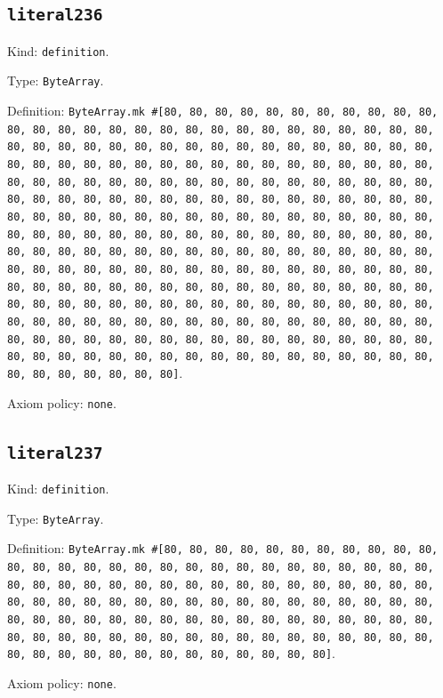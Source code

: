 \documentclass[11pt]{article}
\begin{document}
\subsection*{\texttt{literal236}}
\noindent Kind: \texttt{definition}.\par
\noindent Type: \texttt{ByteArray}.\par
\noindent Definition: \texttt{ByteArray.mk \#[80, 80, 80, 80, 80, 80, 80, 80, 80, 80, 80, 80, 80, 80, 80, 80, 80, 80, 80, 80, 80, 80, 80, 80, 80, 80, 80, 80, 80, 80, 80, 80, 80, 80, 80, 80, 80, 80, 80, 80, 80, 80, 80, 80, 80, 80, 80, 80, 80, 80, 80, 80, 80, 80, 80, 80, 80, 80, 80, 80, 80, 80, 80, 80, 80, 80, 80, 80, 80, 80, 80, 80, 80, 80, 80, 80, 80, 80, 80, 80, 80, 80, 80, 80, 80, 80, 80, 80, 80, 80, 80, 80, 80, 80, 80, 80, 80, 80, 80, 80, 80, 80, 80, 80, 80, 80, 80, 80, 80, 80, 80, 80, 80, 80, 80, 80, 80, 80, 80, 80, 80, 80, 80, 80, 80, 80, 80, 80, 80, 80, 80, 80, 80, 80, 80, 80, 80, 80, 80, 80, 80, 80, 80, 80, 80, 80, 80, 80, 80, 80, 80, 80, 80, 80, 80, 80, 80, 80, 80, 80, 80, 80, 80, 80, 80, 80, 80, 80, 80, 80, 80, 80, 80, 80, 80, 80, 80, 80, 80, 80, 80, 80, 80, 80, 80, 80, 80, 80, 80, 80, 80, 80, 80, 80, 80, 80, 80, 80, 80, 80, 80, 80, 80, 80, 80, 80, 80, 80, 80, 80, 80, 80, 80, 80, 80, 80, 80, 80, 80, 80, 80, 80, 80, 80, 80, 80, 80, 80, 80, 80, 80, 80, 80, 80, 80, 80, 80, 80, 80, 80, 80, 80, 80, 80, 80, 80, 80, 80, 80, 80, 80, 80, 80, 80, 80, 80]}.\par
\noindent Axiom policy: \texttt{none}.\par
\subsection*{\texttt{literal237}}
\noindent Kind: \texttt{definition}.\par
\noindent Type: \texttt{ByteArray}.\par
\noindent Definition: \texttt{ByteArray.mk \#[80, 80, 80, 80, 80, 80, 80, 80, 80, 80, 80, 80, 80, 80, 80, 80, 80, 80, 80, 80, 80, 80, 80, 80, 80, 80, 80, 80, 80, 80, 80, 80, 80, 80, 80, 80, 80, 80, 80, 80, 80, 80, 80, 80, 80, 80, 80, 80, 80, 80, 80, 80, 80, 80, 80, 80, 80, 80, 80, 80, 80, 80, 80, 80, 80, 80, 80, 80, 80, 80, 80, 80, 80, 80, 80, 80, 80, 80, 80, 80, 80, 80, 80, 80, 80, 80, 80, 80, 80, 80, 80, 80, 80, 80, 80, 80, 80, 80, 80, 80, 80, 80, 80, 80, 80, 80, 80, 80, 80]}.\par
\noindent Axiom policy: \texttt{none}.\par
\end{document}
